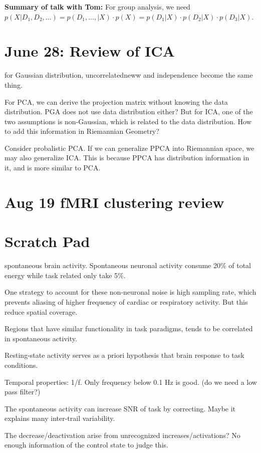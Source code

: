 \documentclass[12pt]{article}
\begin{document}
\textbf{Summary of talk with Tom: } For group analysis, we need $p(X | D_1, D_2,\dots) = p(D_1,\dots, | X) \cdot p(X) = p(D_1|X)\cdot p(D_2|X) \cdot p(D_3|X)$. 

\section{June 28: Review of ICA}
for Gaussian distribution, uncorrelatedneww and independence become the same thing.

For PCA, we can derive the projection matrix without knowing the data distribution. PGA does not use data distribution either? But for ICA, one of the two assumptions is non-Gaussian, which is related to the data distribution. How to add this information in Riemannian Geometry? 

Consider probalistic PCA. If we can generalize PPCA into Riemannian space, we may also generalize ICA. This is because PPCA has distribution information in it, and is more similar to PCA.

\section{Aug 19 fMRI clustering review}
 


\section{Scratch Pad}
spontaneous brain activity. Spontaneous neuronal activity consume 20\% of total energy while task related only take 5\%.

One strategy to account for these non-neuronal noise is high sampling rate, which prevents aliasing of higher frequency of cardiac or respiratory activity. But this reduce spatial coverage.

Regions that have similar functionality in task paradigms, tends to be correlated in spontaneous activity.

Resting-state activity serves as a priori hypothesis that brain response to task conditions.

Temporal properties: 1/f. Only frequency below 0.1 Hz is good. (do we need a low pass filter?)

The spontaneous activity can increase SNR of task by correcting. Maybe it explains many inter-trail variability. 

The decrease/deactivation arise from unrecognized increases/activations? No enough information of the control state to judge this.
\end{document}
